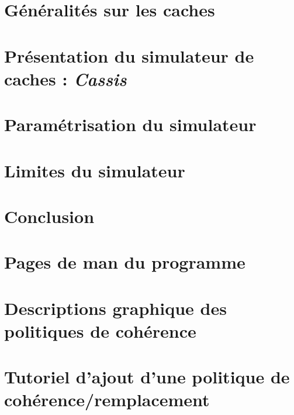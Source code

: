 \documentclass[a4paper]{report}
\begin{document}


\newpage
\tableofcontents

\renewcommand{\labelitemi}{$\bullet$}

\newpage

\newpage
\chapter{Généralités sur les caches}

\newpage
\chapter{Présentation du simulateur de caches : \emph{Cassis}}

\newpage
\chapter{Paramétrisation du simulateur}

\newpage
\chapter{Limites du simulateur}

\newpage
\chapter*{Conclusion}

\newpage
\appendix
\chapter{Pages de man du programme}

\chapter{Descriptions graphique des politiques de cohérence}

\chapter{Tutoriel d'ajout d'une politique de cohérence/remplacement}

\nocite{*}


\end{document}

